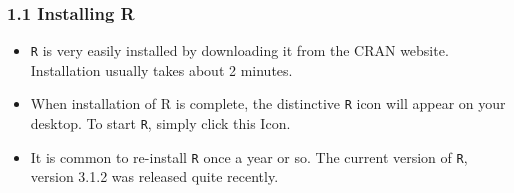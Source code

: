 \documentclass{beamer}
\begin{document}
 	\begin{frame}
 		\frametitle{1.1 Installing R}
 		\begin{itemize}
 			\item \texttt{R} is very easily installed by downloading it from the CRAN website. Installation usually takes
 			about 2 minutes. 
 			\item When installation of R is complete, the distinctive \texttt{R} icon will appear on your
 			desktop. To start \texttt{R}, simply click this Icon. 
 			\item It is common to re-install \texttt{R} once a year or so. The
 			current version of \texttt{R}, version 3.1.2 was released quite recently.
 		\end{itemize}
 		
 	\end{frame}
 	
\end{document}
